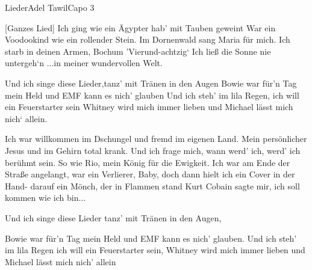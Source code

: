 \begin{song}{Lieder}{Adel Tawil}{Capo 3}

[Ganzes Lied]
Ich ging wie ein Ägypter hab' mit Tauben geweint
War ein Voodookind wie ein rollender Stein.
Im Dornenwald sang Maria für mich.
Ich starb in deinen Armen, Bochum 'Vierund-achtzig`
Ich ließ die Sonne nie untergeh`n
...in meiner wundervollen Welt.

Und ich singe diese Lieder,tanz' mit Tränen in den Augen
Bowie war für'n Tag mein Held und EMF kann es nich' glauben
Und ich steh' im lila Regen, ich will ein Feuerstarter sein
Whitney wird mich immer lieben und Michael lässt mich nich` allein.

Ich war willkommen im Dschungel und fremd im eigenen Land.
Mein persönlicher Jesus und im Gehirn total krank.
Und ich frage mich, wann werd' ich, werd' ich berühmt sein.
So wie Rio, mein König für die Ewigkeit.
Ich war am Ende der Straße angelangt,
war ein Verlierer, Baby, doch dann hielt ich ein Cover in der Hand-
darauf ein Mönch, der in Flammen stand
Kurt Cobain sagte mir, ich soll kommen wie ich bin...

Und ich singe diese Lieder tanz' mit Tränen in den Augen,

Bowie war für'n Tag mein Held und EMF kann es nich' glauben.
Und ich steh' im lila Regen ich will ein Feuerstarter sein,
Whitney wird mich immer lieben und Michael lässt mich nich' allein


\end{song}
